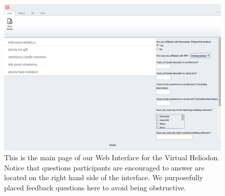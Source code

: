 \documentclass[12pt]{article}
\begin{document}
\begin{figure}[h]
\centering
\includegraphics[scale=0.4]{ss_load}
\caption{This is the main page of our Web Interface for the Virtual Heliodon. Notice that questions participants are encouraged to answer are located on the right hand side of the interface. We purposefully placed feedback questions here to avoid being obstructive. }
\label{fig:sfig1}
\end{figure}
\end{document}
